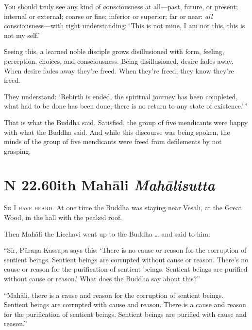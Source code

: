 \documentclass[12pt,openany]{book}%
\newcommand*{\suttatitleacronym}[1]{\smaller[2]{#1}\vspace*{.3em}}
\newcommand*{\suttatitletranslation}[1]{\linebreak{#1}}
\newcommand*{\suttatitleroot}[1]{\linebreak\smaller[2]\itshape{#1}}
\newcommand*{\tocacronym}[1]{\hspace*{-3.3em}{#1}\quad}
\newcommand*{\toctranslation}[1]{#1}
\newcommand*{\tocroot}[1]{(\textit{#1})}
\newcommand*{\scevam}[1]{\textsc{#1}}
\begin{document}
You should truly see any kind of consciousness at all—past, future, or present; internal or external; coarse or fine; inferior or superior; far or near: \emph{all} consciousness—with right understanding: ‘This is not mine, I am not this, this is not my self.’ 

Seeing this, a learned noble disciple grows disillusioned with form, feeling, perception, choices, and consciousness. Being disillusioned, desire fades away. When desire fades away they’re freed. When they’re freed, they know they’re freed. 

They understand: ‘Rebirth is ended, the spiritual journey has been completed, what had to be done has been done, there is no return to any state of existence.’” 

That is what the Buddha said. Satisfied, the group of five mendicants were happy with what the Buddha said. And while this discourse was being spoken, the minds of the group of five mendicants were freed from defilements by not grasping. 

%
\section*{{\suttatitleacronym SN 22.60}{\suttatitletranslation With Mahāli }{\suttatitleroot Mahālisutta}}
\addcontentsline{toc}{section}{\tocacronym{SN 22.60} \toctranslation{With Mahāli } \tocroot{Mahālisutta}}

\scevam{So I have heard. }At one time the Buddha was staying near \textsanskrit{Vesālī}, at the Great Wood, in the hall with the peaked roof. 

Then \textsanskrit{Mahāli} the Licchavi went up to the Buddha … and said to him: 

“Sir, \textsanskrit{Pūraṇa} Kassapa says this: ‘There is no cause or reason for the corruption of sentient beings. Sentient beings are corrupted without cause or reason. There’s no cause or reason for the purification of sentient beings. Sentient beings are purified without cause or reason.’ What does the Buddha say about this?” 

“\textsanskrit{Mahāli}, there is a cause and reason for the corruption of sentient beings. Sentient beings are corrupted with cause and reason. There is a cause and reason for the purification of sentient beings. Sentient beings are purified with cause and reason.” 
\end{document}
